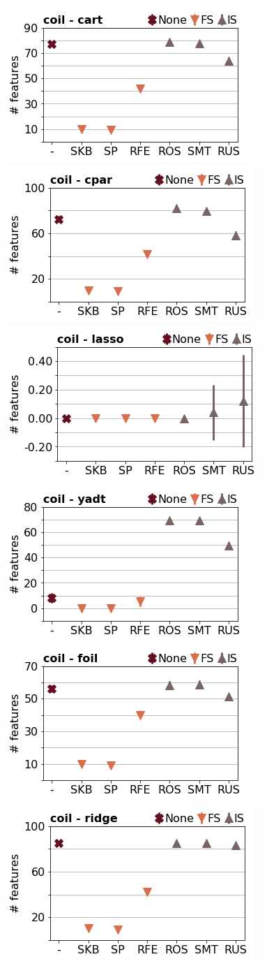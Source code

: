 \documentclass[runningheads,a4paper]{llncs}
\begin{document}
\begin{figure}[!h]
\includegraphics[width=0.32\linewidth]{fig/preps_coil2000_DT_sklearn_nbr_features.png}
\includegraphics[width=0.32\linewidth]{fig/preps_coil2000_RB_cpar_nbr_features.png}
\includegraphics[width=0.32\linewidth]{fig/preps_coil2000_LM_lasso_nbr_features.png}
\includegraphics[width=0.32\linewidth]{fig/preps_coil2000_DT_yadt_nbr_features.png}
\includegraphics[width=0.32\linewidth]{fig/preps_coil2000_RB_foil_nbr_features.png}
\includegraphics[width=0.32\linewidth]{fig/preps_coil2000_LM_ridge_nbr_features.png}
\end{figure}
\end{document}

